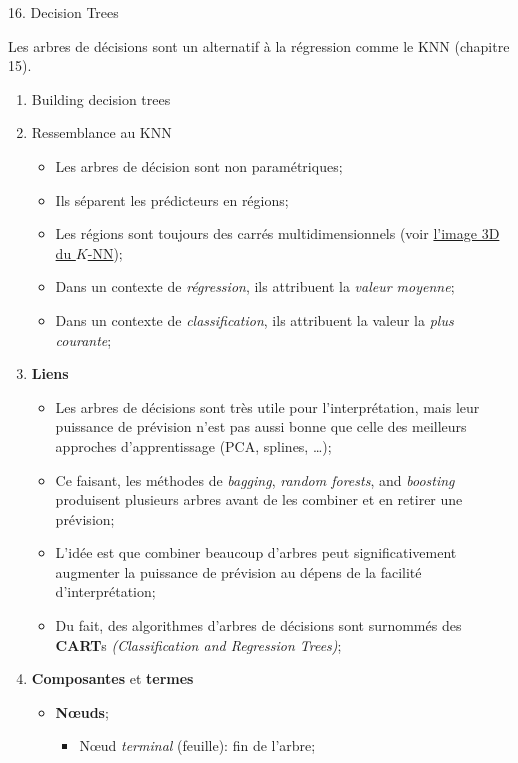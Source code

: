 \documentclass[12pt, titlepage, french]{report}
\begin{document}
\begin{CHPT_SUMM}[label = {DECISION-TREES}]{16. Decision Trees}
Les arbres de décisions sont un alternatif à la régression comme le KNN (chapitre 15). 

\begin{enumerate}
	\item	Building decision trees
%	
	\item[]	Ressemblance au KNN
		\begin{itemize}
		\item	Les arbres de décision sont non paramétriques;
		\item	Ils séparent les prédicteurs en régions;
		\item[]	Les régions sont toujours des carrés multidimensionnels (voir \hyperref[fig:KNN-3D]{l'image 3D du $K$-NN});
		\item	Dans un contexte de \textit{régression}, ils attribuent la \textit{valeur moyenne};
		\item	Dans un contexte de \textit{classification}, ils attribuent la valeur la \textit{plus courante};
		\end{itemize}
%		
	\item[]	\textbf{Liens}
		\begin{itemize}
		\item	Les arbres de décisions sont très utile pour l'interprétation, mais leur puissance de prévision n'est pas aussi bonne que celle des meilleurs approches d'apprentissage (PCA, splines, \dots);
		\item	Ce faisant, les méthodes de \textit{bagging}, \textit{random forests}, and \textit{boosting} produisent plusieurs arbres avant de les combiner et en retirer une prévision;
		\item	L'idée est que combiner beaucoup d'arbres peut significativement augmenter la puissance de prévision au dépens de la facilité d'interprétation;
		\item	Du fait, des algorithmes d'arbres de décisions sont surnommés des \textbf{CART}s \textit{(Classification and Regression Trees)};
		\end{itemize}
%		
	\item[]	\textbf{Composantes} et \textbf{termes}
		\begin{itemize}
		\item	\textbf{Nœuds};
			\begin{itemize}
			\item	Nœud \textit{terminal} (feuille): fin de l'arbre;

\end{itemize}
\end{itemize}
\end{enumerate}
\end{CHPT_SUMM}
\end{document}
